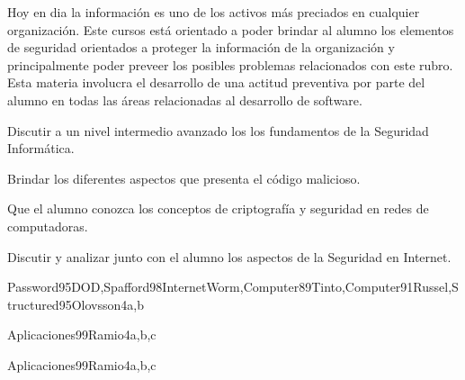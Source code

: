 \begin{syllabus}


\begin{justification}
Hoy en dia la información es uno de los activos más preciados en cualquier organización. 
Este cursos está orientado a poder brindar al alumno los elementos de seguridad orientados a proteger la 
información de la organización y principalmente poder preveer los posibles problemas relacionados con este rubro. 
Esta materia involucra el desarrollo de una actitud preventiva por parte del alumno en todas las áreas 
relacionadas al desarrollo de software.
\end{justification}

\begin{goals}
\item Discutir a un nivel intermedio avanzado los los fundamentos de la Seguridad Informática.
\item Brindar los diferentes aspectos que presenta el código malicioso.
\item Que el alumno conozca los conceptos de criptografía y seguridad en redes de computadoras.
\item Discutir y analizar junto con el alumno los aspectos de la Seguridad en Internet.
\end{goals}

\begin{outcomes}
\end{outcomes}

\begin{unit}{\PFFoundationsInformationSecurityDef}{}{Password95DOD,Spafford98InternetWorm,Computer89Tinto,Computer91Russel,Structured95Olovsson}{4}{a,b}
    \PFFoundationsInformationSecurityAllTopics
    \PFFoundationsInformationSecurityAllObjectives
\end{unit}

\begin{unit}{\PFSecureProgrammingDef}{}{Aplicaciones99Ramio}{4}{a,b,c}
    \PFSecureProgrammingAllTopics
    \PFSecureProgrammingAllObjectives
\end{unit}

\begin{unit}{\OSSecurityModelsDef}{}{Aplicaciones99Ramio}{4}{a,b,c}
    \OSSecurityModelsAllTopics
    \OSSecurityModelsAllObjectives
\end{unit}


\end{syllabus}
